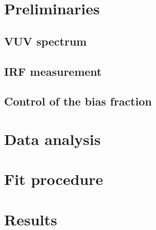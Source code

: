 \section{Preliminaries}


\subsection{VUV spectrum}
\subsection{IRF measurement}
\subsection{Control of the bias fraction}

\section{Data analysis}
\section{Fit procedure}
\section{Results}